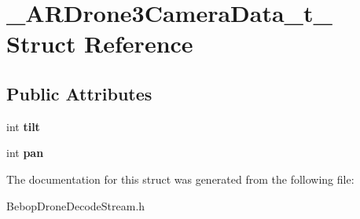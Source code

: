 \hypertarget{struct__ARDrone3CameraData__t__}{}\section{\+\_\+\+A\+R\+Drone3\+Camera\+Data\+\_\+t\+\_\+ Struct Reference}
\label{struct__ARDrone3CameraData__t__}
\subsection*{Public Attributes}
\begin{DoxyCompactItemize}
\item 
\hypertarget{struct__ARDrone3CameraData__t___ad7502c8c0a61a2631c2047701f2a0ca0}{}int {\bfseries tilt}\label{struct__ARDrone3CameraData__t___ad7502c8c0a61a2631c2047701f2a0ca0}

\item 
\hypertarget{struct__ARDrone3CameraData__t___ac11aa79599aeef7ca412d83fc23672a3}{}int {\bfseries pan}\label{struct__ARDrone3CameraData__t___ac11aa79599aeef7ca412d83fc23672a3}

\end{DoxyCompactItemize}


The documentation for this struct was generated from the following file\+:\begin{DoxyCompactItemize}
\item 
Bebop\+Drone\+Decode\+Stream.\+h\end{DoxyCompactItemize}

